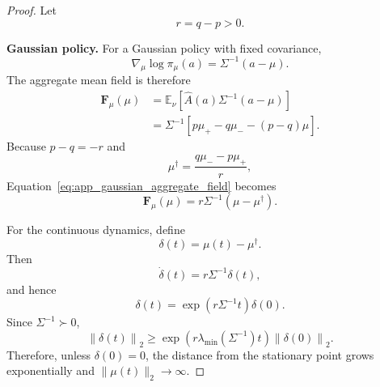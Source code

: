 \documentclass[sigconf,anonymous,review]{acmart}
\theoremstyle{acmdefinition}
\begin{document}
\begin{proof}
Let
\begin{equation}
    r
    =
    q-p
    >
    0.
\end{equation}

\medskip
\noindent\textbf{Gaussian policy.}
For a Gaussian policy with fixed covariance,
\begin{equation}
    \nabla_{\mu}
    \log\pi_{\mu}(a)
    =
    \Sigma^{-1}(a-\mu).
    \label{eq:app_gaussian_mean_score}
\end{equation}
The aggregate mean field is therefore
\begin{equation}
\begin{aligned}
    \mathbf{F}_{\mu}(\mu)
    &=
    \mathbb{E}_{\nu}
    \left[
        \widehat{A}(a)
        \Sigma^{-1}(a-\mu)
    \right] \\
    &=
    \Sigma^{-1}
    \left[
        p\mu_{+}
        -
        q\mu_{-}
        -
        (p-q)\mu
    \right].
\end{aligned}
\label{eq:app_gaussian_aggregate_field}
\end{equation}
Because $p-q=-r$ and
\begin{equation}
    \mu^{\dagger}
    =
    \frac{
        q\mu_{-}
        -
        p\mu_{+}
    }{
        r
    },
\end{equation}
Equation~\eqref{eq:app_gaussian_aggregate_field} becomes
\begin{equation}
    \mathbf{F}_{\mu}(\mu)
    =
    r\Sigma^{-1}
    \left(
        \mu-\mu^{\dagger}
    \right).
\end{equation}

For the continuous dynamics, define
\begin{equation}
    \delta(t)
    =
    \mu(t)-\mu^{\dagger}.
\end{equation}
Then
\begin{equation}
    \dot{\delta}(t)
    =
    r\Sigma^{-1}\delta(t),
\end{equation}
and hence
\begin{equation}
    \delta(t)
    =
    \exp
    \left(
        r\Sigma^{-1}t
    \right)
    \delta(0).
    \label{eq:app_gaussian_continuous_solution}
\end{equation}
Since $\Sigma^{-1}\succ0$,
\begin{equation}
    \left\|
        \delta(t)
    \right\|_2
    \geq
    \exp
    \left(
        r\lambda_{\min}
        \left(
            \Sigma^{-1}
        \right)t
    \right)
    \left\|
        \delta(0)
    \right\|_2.
    \label{eq:app_gaussian_continuous_growth}
\end{equation}
Therefore, unless
$\delta(0)=0$, the distance from the stationary point grows
exponentially and
$\|\mu(t)\|_2\rightarrow\infty$.


\end{proof}
\end{document}
